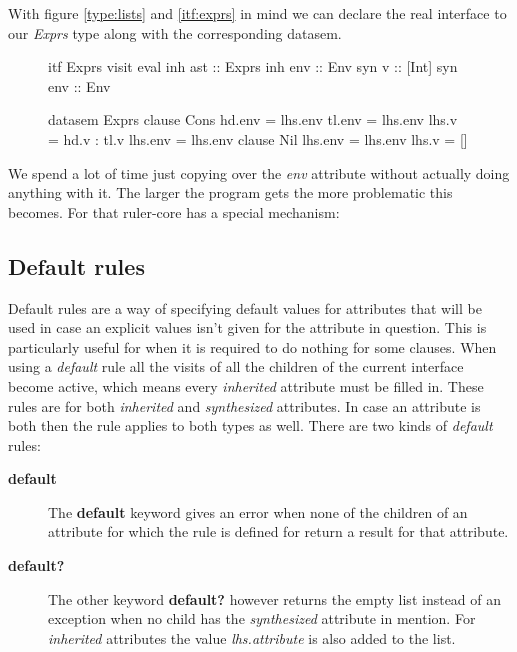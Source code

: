 With figure \ref{type:lists} and \ref{itf:exprs} in mind we can declare the real interface to our \emph{Exprs} type along with the corresponding datasem.

\begin{figure}
\begin{minipage}[t]{0.4\linewidth}
\begin{code}
itf Exprs
  visit eval 
    inh ast :: Exprs
    inh env :: Env
    syn v   :: [Int]
    syn env :: Env
\end{code}
\end{minipage}
\begin{minipage}[t]{0.6\linewidth}
\begin{code}
datasem Exprs
   clause Cons
     hd.env  = lhs.env
     tl.env  = lhs.env
     lhs.v   = hd.v : tl.v
     lhs.env = lhs.env
   clause Nil
     lhs.env = lhs.env
     lhs.v   = []
\end{code}
\end{minipage}
\end{figure}

We spend a lot of time just copying over the \emph{env} attribute without actually doing anything with it. The larger the program gets the more problematic this becomes. For that ruler-core has a special mechanism:

\subsection{Default rules}
Default rules are a way of specifying default values for attributes that will be used in case an explicit values isn't given for the attribute in question. This is particularly useful for when it is required to do nothing for some clauses.
When using a \emph{default} rule all the visits of all the children of the current interface become active, which means every \emph{inherited} attribute must be filled in.
These rules are for both \emph{inherited} and \emph{synthesized} attributes. In case an attribute is both then the rule applies to both types as well. There are two kinds of \emph{default} rules:
\begin{description}
\item[\textbf{default}] { The \textbf{default} keyword gives an error when none of the children of an attribute for which the rule is defined for return a result for that attribute. }
\item[\textbf{default?}] { The other keyword \textbf{default?} however returns the empty list instead of an exception when no child has the \emph{synthesized} attribute in mention. For \emph{inherited} attributes the value \emph{lhs.attribute} is also added to the list. }
\end{description}

